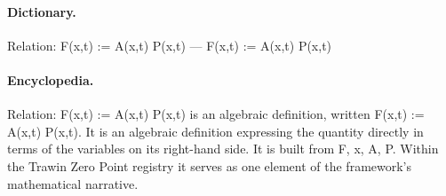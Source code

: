 \paragraph{Dictionary.}
Relation: F(x,t) := A(x,t) P(x,t) — F(x,t) := A(x,t) P(x,t)

\paragraph{Encyclopedia.}
Relation: F(x,t) := A(x,t) P(x,t) is an algebraic definition, written F(x,t) := A(x,t) P(x,t). It is an algebraic definition expressing the quantity directly in terms of the variables on its right-hand side. It is built from F, x, A, P. Within the Trawin Zero Point registry it serves as one element of the framework's mathematical narrative.
